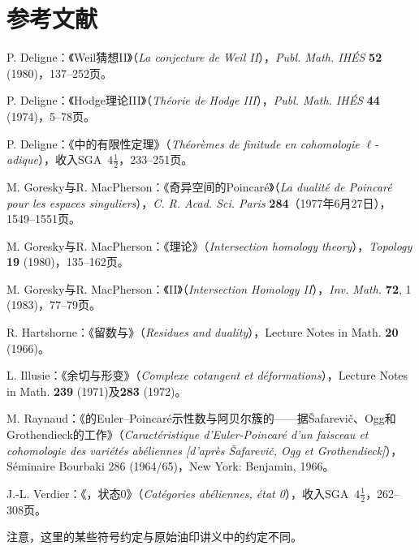 \chapter*{参考文献}
\begin{description}[leftmargin=2.5em,labelwidth=2em]
\item[{[1]}] P. Deligne：《Weil猜想II》（\emph{La conjecture de Weil II}），\emph{Publ. Math. IHÉS} \textbf{52} (1980)，137--252页。
\item[{[2]}] P. Deligne：《Hodge理论III》（\emph{Théorie de Hodge III}），\emph{Publ. Math. IHÉS} \textbf{44} (1974)，5--78页。
\item[{[3]}] P. Deligne：《中的有限性定理》（\emph{Théorèmes de finitude en cohomologie $\ell$-adique}），收入SGA~$4\frac12$，233--251页。
\item[{[4]}] M. Goresky与R. MacPherson：《奇异空间的Poincaré》（\emph{La dualité de Poincaré pour les espaces singuliers}），\emph{C. R. Acad. Sci. Paris} \textbf{284}（1977年6月27日），1549--1551页。
\item[{[5]}] M. Goresky与R. MacPherson：《理论》（\emph{Intersection homology theory}），\emph{Topology} \textbf{19} (1980)，135--162页。
\item[{[6]}] M. Goresky与R. MacPherson：《II》（\emph{Intersection Homology II}），\emph{Inv. Math.} \textbf{72}, 1 (1983)，77--79页。
\item[{[7]}] R. Hartshorne：《留数与》（\emph{Residues and duality}），Lecture Notes in Math. \textbf{20} (1966)。
\item[{[8]}] L. Illusie：《余切与形变》（\emph{Complexe cotangent et déformations}），Lecture Notes in Math. \textbf{239} (1971)及\textbf{283} (1972)。
\item[{[9]}] M. Raynaud：《的Euler--Poincaré示性数与阿贝尔簇的——据Šafarevič、Ogg和Grothendieck的工作》（\emph{Caractéristique d'Euler-Poincaré d'un faisceau et cohomologie des variétés abéliennes [d'après Šafarevič, Ogg et Grothendieck]}），Séminaire Bourbaki 286 (1964/65)，New York: Benjamin, 1966。
\item[{[10]}] J.-L. Verdier：《，状态0》（\emph{Catégories abéliennes, état 0}），收入SGA~$4\frac12$，262--308页。

注意，这里的某些符号约定与原始油印讲义中的约定不同。
\end{description}

